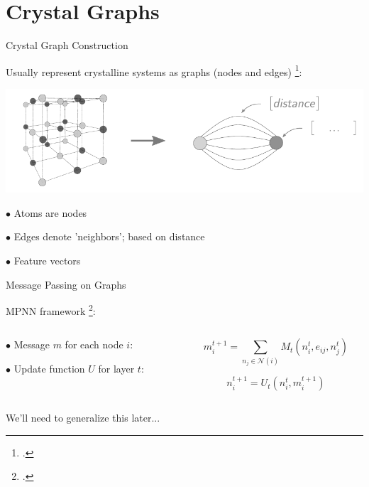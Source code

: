 \documentclass[11pt]{beamer}
\begin{document}
\section{Crystal Graphs}
\begin{frame}{Crystal Graph Construction}

Usually represent crystalline systems as graphs (nodes and edges) \footcite{cgcnn}:

\begin{center}

\includegraphics[scale=0.7]{crystalgraph2.pdf}\pause
\end{center}

$\bullet$ Atoms are nodes

\medskip

$\bullet$ Edges denote 'neighbors'; based on distance

\medskip

$\bullet$ Feature vectors
\end{frame}

\begin{frame}{Message Passing on Graphs}

MPNN framework  \footcite{mpnn}:\pause
\begin{center}
\medskip
\begin{columns}
\begin{column}{0.52\textwidth}
$\bullet$ Message $m$ for each node $i$:

\vspace{1.53cm}

$\bullet$ Update function $U$ for layer $t$:
\end{column}
\begin{column}{0.45\textwidth}
$$
m_i^{t+1}=\sum_{n_j\in \mathcal{N}(i)} M_t(n_i^{t},e_{ij},n_j^t )
$$

$$
n_i^{t+1}=U_t(n_i^t,m_i^{t+1})
$$
\end{column}
\end{columns}

\vspace{1cm}\pause

We'll need to generalize this later...
\end{center}
\end{frame}
\end{document}
